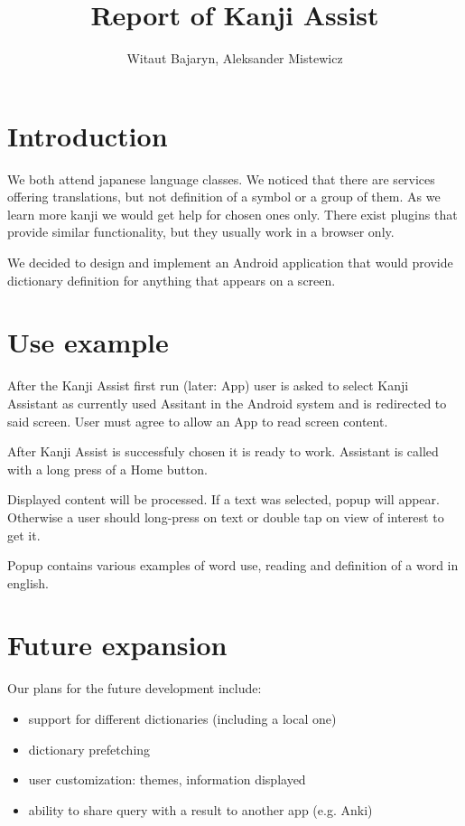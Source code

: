 \documentclass[11pt,a4paper]{article}
\title{Report of Kanji Assist}
\author{Witaut Bajaryn, Aleksander Mistewicz}
\begin{document}
\maketitle
\newpage

\section{Introduction}

We both attend japanese language classes. We noticed that there are services
offering translations, but not definition of a symbol or a group of them.
As we learn more kanji we would get help for chosen ones only.
There exist plugins that provide similar functionality, but they usually
work in a browser only.

We decided to design and implement an Android application that would
provide dictionary definition for anything that appears on a screen.

\section{Use example}

After the Kanji Assist first run (later: App) user is asked to select Kanji
Assistant as currently used Assitant in the Android system and is redirected
to said screen. User must agree to allow an App to read screen content.

After Kanji Assist is successfuly chosen it is ready to work. Assistant
is called with a long press of a Home button.

Displayed content will be processed. If a text was selected, popup will appear.
Otherwise a user should long-press on text or double tap on view of interest
to get it.

Popup contains various examples of word use, reading and definition of a word
in english.

\section{Future expansion}

Our plans for the future development include:
\begin{itemize}
    \item support for different dictionaries (including a local one)
    \item dictionary prefetching
    \item user customization: themes, information displayed
    \item ability to share query with a result to another app (e.g. Anki)
\end{itemize}
\end{document}
